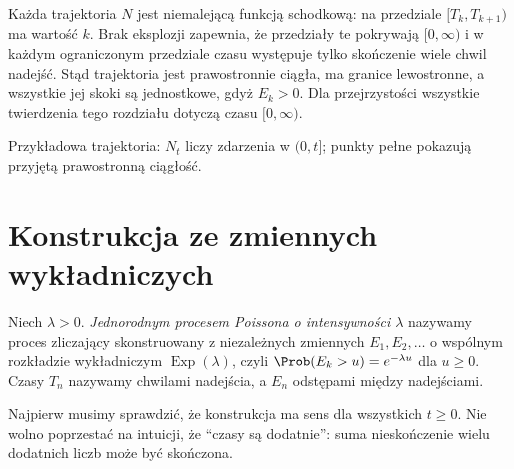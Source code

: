 Każda trajektoria $N$ jest niemalejącą funkcją schodkową:
na przedziale $[T_k,T_{k+1})$ ma wartość $k$.
Brak eksplozji zapewnia, że przedziały te pokrywają
$[0,\infty)$ i w każdym ograniczonym przedziale czasu
występuje tylko skończenie wiele chwil nadejść.
Stąd trajektoria jest prawostronnie ciągła, ma granice
lewostronne, a wszystkie jej skoki są jednostkowe,
gdyż $E_k>0$. Dla przejrzystości wszystkie twierdzenia tego rozdziału
dotyczą czasu $[0,\infty)$.

\begin{center}
\par\smallskip\small Przykładowa trajektoria: $N_t$ liczy zdarzenia w $(0,t]$;
punkty pełne pokazują przyjętą prawostronną ciągłość.
\end{center}

\section{Konstrukcja ze zmiennych wykładniczych}
\begin{definicja}
Niech $\lambda>0$. \emph{Jednorodnym procesem Poissona o intensywności
$\lambda$} nazywamy proces zliczający skonstruowany z niezależnych
zmiennych $E_1,E_2,\ldots$ o wspólnym rozkładzie wykładniczym
$\operatorname{Exp}(\lambda)$, czyli
$\Prob(E_k>u)=e^{-\lambda u}$ dla $u\ge0$.
Czasy $T_n$ nazywamy chwilami nadejścia, a $E_n$ odstępami między
nadejściami.
\end{definicja}

Najpierw musimy sprawdzić, że konstrukcja ma sens dla wszystkich
$t\ge0$. Nie wolno poprzestać na intuicji, że ``czasy są dodatnie'':
suma nieskończenie wielu dodatnich liczb może być skończona.

